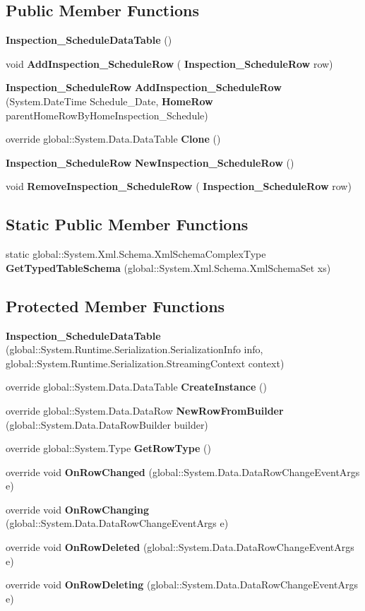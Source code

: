 \subsection*{Public Member Functions}
\begin{DoxyCompactItemize}
\item 
\textbf{ Inspection\+\_\+\+Schedule\+Data\+Table} ()
\item 
void \textbf{ Add\+Inspection\+\_\+\+Schedule\+Row} (\textbf{ Inspection\+\_\+\+Schedule\+Row} row)
\item 
\textbf{ Inspection\+\_\+\+Schedule\+Row} \textbf{ Add\+Inspection\+\_\+\+Schedule\+Row} (System.\+Date\+Time Schedule\+\_\+\+Date, \textbf{ Home\+Row} parent\+Home\+Row\+By\+Home\+Inspection\+\_\+\+Schedule)
\item 
override global\+::\+System.\+Data.\+Data\+Table \textbf{ Clone} ()
\item 
\textbf{ Inspection\+\_\+\+Schedule\+Row} \textbf{ New\+Inspection\+\_\+\+Schedule\+Row} ()
\item 
void \textbf{ Remove\+Inspection\+\_\+\+Schedule\+Row} (\textbf{ Inspection\+\_\+\+Schedule\+Row} row)
\end{DoxyCompactItemize}
\subsection*{Static Public Member Functions}
\begin{DoxyCompactItemize}
\item 
static global\+::\+System.\+Xml.\+Schema.\+Xml\+Schema\+Complex\+Type \textbf{ Get\+Typed\+Table\+Schema} (global\+::\+System.\+Xml.\+Schema.\+Xml\+Schema\+Set xs)
\end{DoxyCompactItemize}
\subsection*{Protected Member Functions}
\begin{DoxyCompactItemize}
\item 
\textbf{ Inspection\+\_\+\+Schedule\+Data\+Table} (global\+::\+System.\+Runtime.\+Serialization.\+Serialization\+Info info, global\+::\+System.\+Runtime.\+Serialization.\+Streaming\+Context context)
\item 
override global\+::\+System.\+Data.\+Data\+Table \textbf{ Create\+Instance} ()
\item 
override global\+::\+System.\+Data.\+Data\+Row \textbf{ New\+Row\+From\+Builder} (global\+::\+System.\+Data.\+Data\+Row\+Builder builder)
\item 
override global\+::\+System.\+Type \textbf{ Get\+Row\+Type} ()
\item 
override void \textbf{ On\+Row\+Changed} (global\+::\+System.\+Data.\+Data\+Row\+Change\+Event\+Args e)
\item 
override void \textbf{ On\+Row\+Changing} (global\+::\+System.\+Data.\+Data\+Row\+Change\+Event\+Args e)
\item 
override void \textbf{ On\+Row\+Deleted} (global\+::\+System.\+Data.\+Data\+Row\+Change\+Event\+Args e)
\item 
override void \textbf{ On\+Row\+Deleting} (global\+::\+System.\+Data.\+Data\+Row\+Change\+Event\+Args e)
\end{DoxyCompactItemize}
